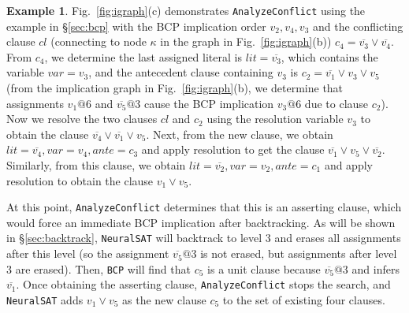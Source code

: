 \documentclass[oneside,11pt,dvipsnames]{book}
\numberwithin{equation}{section}
\theoremstyle{definition}
\newtheorem{example}{Example}[section]
\theoremstyle{remark}
\newcommand{\tool}{\texttt{NeuralSAT}}
\begin{document}
\begin{example}

    Fig.~\ref{fig:igraph}(c) demonstrates \texttt{AnalyzeConflict} using the example in \S\ref{sec:bcp} with the BCP implication order $v_2,v_4,v_3$ and the conflicting clause $cl$ (connecting to node $\kappa$ in the graph in Fig.~\ref{fig:igraph}(b)) $c_4=\overline{v_3} \lor \overline{v_4}$. From $c_4$, we determine the last assigned literal is $lit=\overline{v_3}$, which contains the variable $var=v_3$, and the antecedent clause containing $v_3$ is $c_2=\overline{v_1} \lor v_3 \lor v_5$ (from the implication graph in Fig.~\ref{fig:igraph}(b), we determine that assignments $v_1@6$ and $\overline{v_5}@3$ cause the BCP implication $v_3@6$ due to clause $c_2$). Now we resolve the two clauses $cl$ and $c_2$ using the resolution variable $v_3$ to obtain the clause $\overline{v_4} \lor \overline{v_1} \lor v_5$.
Next, from the new clause, we obtain $lit=\overline{v_4}, var=v_4, ante=c_3$ and apply resolution to get the clause $\overline{v_1} \vee v_5 \lor \overline{v_2}$.
Similarly, from this clause, we obtain $lit=\overline{v_2}, var=v_2, ante=c_1$ and apply resolution to obtain the clause $v_1 \lor v_5$.


At this point, \texttt{AnalyzeConflict} determines that this is an asserting clause, which would force an immediate BCP implication after backtracking. As will be shown in \S\ref{sec:backtrack}, \tool{} will backtrack to level 3 and erases all assignments after this level (so the assignment $\overline{v_5}@3$ is not erased, but assignments after level 3 are erased).  Then, \texttt{BCP} will find that $c_5$ is a unit clause because $\overline{v_5}@3$ and infers $\overline{v_1}$.
Once obtaining the asserting clause, \texttt{AnalyzeConflict} stops the search, and \tool{} adds  $v_1\lor v_5$ as the new clause $c_5$ to the set of existing four clauses.

\end{example}
\end{document}
